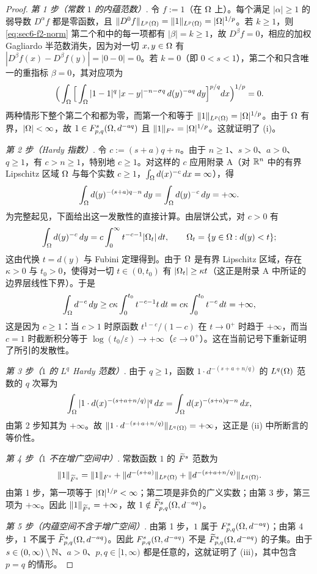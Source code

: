 \begin{proof}
\emph{第 1 步（常数 $1$ 的内蕴范数）}. 令 $f:=1$（在 $\Omega$ 上）。每个满足 $|\alpha|\ge1$ 的弱导数 $D^\alpha f$ 都是零函数，且 $\|D^0 f\|_{L^p(\Omega)}=\|1\|_{L^p(\Omega)}=|\Omega|^{1/p}$。若 $k\ge1$，则 \eqref{eq:sec6-f2-norm} 第二个和中的每一项都有 $|\beta|=k\ge1$，故 $D^\beta f=0$，相应的加权 Gagliardo 半范数消失，因为对一切 $x,y\in\Omega$ 有 $|D^\beta f(x)-D^\beta f(y)|=|0-0|=0$。若 $k=0$（即 $0<s<1$），第二个和只含唯一的重指标 $\beta=0$，其对应项为
\[
  \Big(\int_\Omega\Big[\int_\Omega|1-1|^q\,|x-y|^{-n-\sigma q}\,d(y)^{-aq}\,dy\Big]^{p/q}dx\Big)^{1/p}=0.
\]
两种情形下整个第二个和都为零，而第一个和等于 $\|1\|_{L^p(\Omega)}=|\Omega|^{1/p}$。由于 $\Omega$ 有界，$|\Omega|<\infty$，故 $1\in F^{s}_{p,q}(\Omega,d^{-aq})$ 且 $\|1\|_{F^s}=|\Omega|^{1/p}$。这就证明了 (i)。

\emph{第 2 步（Hardy 指数）}. 令 $c:=(s+a)q+n$。由于 $n\ge1$、$s>0$、$a>0$、$q\ge1$，有 $c>n\ge1$，特别地 $c\ge1$。对这样的 $c$ 应用附录 A（对 $\mathbb{R}^n$ 中的有界 Lipschitz 区域 $\Omega$ 与每个实数 $c\ge1$，$\int_\Omega d(x)^{-c}\,dx=\infty$），得
\[
  \int_\Omega d(y)^{-(s+a)q-n}\,dy=\int_\Omega d(y)^{-c}\,dy=+\infty.
\]
为完整起见，下面给出这一发散性的直接计算。由层饼公式，对 $c>0$ 有
\[
  \int_\Omega d(y)^{-c}\,dy=c\int_0^\infty t^{-c-1}|\Omega_{t}|\,dt,
  \qquad \Omega_{t}=\{y\in\Omega:d(y)<t\};
\]
这由代换 $t=d(y)$ 与 Fubini 定理得到。由于 $\Omega$ 是有界 Lipschitz 区域，存在 $\kappa>0$ 与 $t_0>0$，使得对一切 $t\in(0,t_0)$ 有 $|\Omega_{t}|\ge\kappa t$（这正是附录 A 中所证的边界层线性下界）。于是
\[
  \int_\Omega d^{-c}\,dy\ge c\kappa\int_0^{t_0}t^{-c-1}t\,dt=c\kappa\int_0^{t_0}t^{-c}\,dt=+\infty,
\]
这是因为 $c\ge1$：当 $c>1$ 时原函数 $t^{1-c}/(1-c)$ 在 $t\to0^+$ 时趋于 $+\infty$，而当 $c=1$ 时截断积分等于 $\log(t_0/\varepsilon)\to+\infty$（$\varepsilon\to0^+$）。这在当前记号下重新证明了所引的发散性。

\emph{第 3 步（$1$ 的 $L^q$ Hardy 范数）}. 由于 $q\ge1$，函数 $1\cdot d^{-(s+a+n/q)}$ 的 $L^q(\Omega)$ 范数的 $q$ 次幂为
\[
  \int_\Omega|1\cdot d(x)^{-(s+a+n/q)}|^q\,dx=\int_\Omega d(x)^{-(s+a)q-n}\,dx,
\]
由第 2 步知其为 $+\infty$。故 $\|1\cdot d^{-(s+a+n/q)}\|_{L^q(\Omega)}=+\infty$，这正是 (ii) 中所断言的等价性。

\emph{第 4 步（$1$ 不在增广空间中）}. 常数函数 $1$ 的 $\widetilde F^s$ 范数为
\[
  \|1\|_{\widetilde F^s}=\|1\|_{F^s}+\|d^{-(s+a)}\|_{L^p(\Omega)}+\|d^{-(s+a+n/q)}\|_{L^q(\Omega)}.
\]
由第 1 步，第一项等于 $|\Omega|^{1/p}<\infty$；第二项是非负的广义实数；由第 3 步，第三项为 $+\infty$。因此 $\|1\|_{\widetilde F^s}=+\infty$，故 $1\notin\widetilde F^{s}_{p,q}(\Omega,d^{-aq})$。

\emph{第 5 步（内蕴空间不含于增广空间）}. 由第 1 步，$1$ 属于 $F^{s}_{p,q}(\Omega,d^{-aq})$；由第 4 步，$1$ 不属于 $\widetilde F^{s}_{p,q}(\Omega,d^{-aq})$。因此 $F^{s}_{p,q}(\Omega,d^{-aq})$ 不是 $\widetilde F^{s}_{p,q}(\Omega,d^{-aq})$ 的子集。由于 $s\in(0,\infty)\setminus\mathbb{N}$、$a>0$、$p,q\in[1,\infty)$ 都是任意的，这就证明了 (iii)，其中包含 $p=q$ 的情形。
\end{proof}

